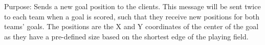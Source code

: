 Purpose: Sends a new goal position to the clients.
This message will be sent twice to each team when a goal is scored, such that they receive new positions for both teams' goals.
The positions are the X and Y coordinates of the center of the goal as they have a pre-defined size based on the shortest edge of the playing field.
